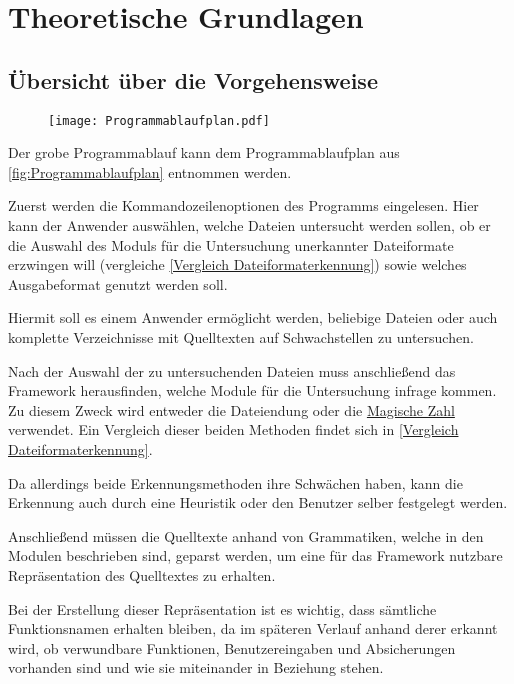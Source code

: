 \chapter{Theoretische Grundlagen}
    \section{Übersicht über die Vorgehensweise}
        \begin{figure}[htp]
            \centering%
            \texttt{[image: Programmablaufplan.pdf]}
            \label{fig:Programmablaufplan}
        \end{figure}
        Der grobe Programmablauf kann dem Programmablaufplan aus
        \vref{fig:Programmablaufplan} entnommen werden.

        Zuerst werden die Kommandozeilenoptionen des Programms eingelesen.
        Hier kann der Anwender auswählen,
        welche Dateien untersucht werden sollen,
        ob er die Auswahl des Moduls für die Untersuchung unerkannter Dateiformate erzwingen will
        (vergleiche
        \vref{Vergleich Dateiformaterkennung}) sowie
        welches Ausgabeformat genutzt werden soll.

        Hiermit soll es einem Anwender ermöglicht werden,
        beliebige Dateien oder
        auch komplette Verzeichnisse mit Quelltexten auf Schwachstellen zu untersuchen.

        Nach der Auswahl der zu untersuchenden Dateien muss anschließend das Framework herausfinden,
        welche Module für die Untersuchung infrage kommen.
        Zu diesem Zweck wird entweder die Dateiendung oder
        die
        \hyperref[Magische Zahl]{Magische Zahl} verwendet.
        Ein Vergleich dieser beiden Methoden findet sich in
        \vref{Vergleich Dateiformaterkennung}.

        Da allerdings beide Erkennungsmethoden ihre Schwächen haben,
        kann die Erkennung auch durch eine Heuristik oder
        den Benutzer selber festgelegt werden.

        Anschließend müssen die Quelltexte anhand von Grammatiken,
        welche in den Modulen beschrieben sind,
        geparst werden,
        um eine für das Framework nutzbare Repräsentation des Quelltextes zu erhalten.

        Bei der Erstellung dieser Repräsentation ist es wichtig,
        dass sämtliche Funktionsnamen erhalten bleiben,
        da im späteren Verlauf anhand derer erkannt wird,
        ob verwundbare Funktionen,
        Benutzereingaben und
        Absicherungen vorhanden sind und
        wie sie miteinander in Beziehung stehen.

